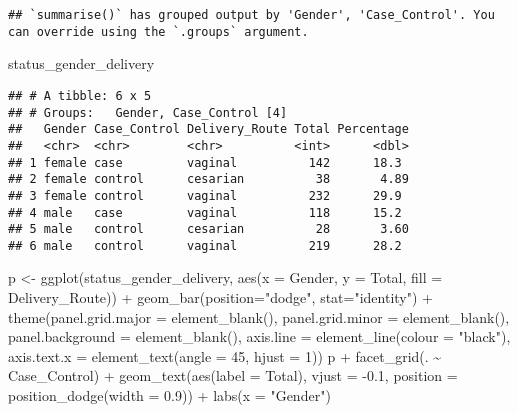 \documentclass[
]{article}
\newenvironment{Shaded}{\begin{snugshade}}{\end{snugshade}}
\newcommand{\AttributeTok}[1]{\textcolor[rgb]{0.77,0.63,0.00}{#1}}
\newcommand{\DecValTok}[1]{\textcolor[rgb]{0.00,0.00,0.81}{#1}}
\newcommand{\FloatTok}[1]{\textcolor[rgb]{0.00,0.00,0.81}{#1}}
\newcommand{\FunctionTok}[1]{\textcolor[rgb]{0.00,0.00,0.00}{#1}}
\newcommand{\NormalTok}[1]{#1}
\newcommand{\OtherTok}[1]{\textcolor[rgb]{0.56,0.35,0.01}{#1}}
\newcommand{\SpecialCharTok}[1]{\textcolor[rgb]{0.00,0.00,0.00}{#1}}
\newcommand{\StringTok}[1]{\textcolor[rgb]{0.31,0.60,0.02}{#1}}
\begin{document}
\begin{verbatim}
## `summarise()` has grouped output by 'Gender', 'Case_Control'. You can override using the `.groups` argument.
\end{verbatim}

\begin{Shaded}
\begin{Highlighting}[]
\NormalTok{status\_gender\_delivery}
\end{Highlighting}
\end{Shaded}

\begin{verbatim}
## # A tibble: 6 x 5
## # Groups:   Gender, Case_Control [4]
##   Gender Case_Control Delivery_Route Total Percentage
##   <chr>  <chr>        <chr>          <int>      <dbl>
## 1 female case         vaginal          142      18.3 
## 2 female control      cesarian          38       4.89
## 3 female control      vaginal          232      29.9 
## 4 male   case         vaginal          118      15.2 
## 5 male   control      cesarian          28       3.60
## 6 male   control      vaginal          219      28.2
\end{verbatim}

\begin{Shaded}
\begin{Highlighting}[]
\NormalTok{p }\OtherTok{\textless{}{-}} \FunctionTok{ggplot}\NormalTok{(status\_gender\_delivery, }\FunctionTok{aes}\NormalTok{(}\AttributeTok{x =}\NormalTok{ Gender, }\AttributeTok{y =}\NormalTok{ Total, }\AttributeTok{fill =}\NormalTok{ Delivery\_Route)) }\SpecialCharTok{+}
  \FunctionTok{geom\_bar}\NormalTok{(}\AttributeTok{position=}\StringTok{"dodge"}\NormalTok{, }\AttributeTok{stat=}\StringTok{"identity"}\NormalTok{) }\SpecialCharTok{+} 
  \FunctionTok{theme}\NormalTok{(}\AttributeTok{panel.grid.major =} \FunctionTok{element\_blank}\NormalTok{(),}
        \AttributeTok{panel.grid.minor =} \FunctionTok{element\_blank}\NormalTok{(), }\AttributeTok{panel.background =} \FunctionTok{element\_blank}\NormalTok{(), }\AttributeTok{axis.line =}
          \FunctionTok{element\_line}\NormalTok{(}\AttributeTok{colour =} \StringTok{"black"}\NormalTok{), }\AttributeTok{axis.text.x =} \FunctionTok{element\_text}\NormalTok{(}\AttributeTok{angle =} \DecValTok{45}\NormalTok{, }\AttributeTok{hjust =} \DecValTok{1}\NormalTok{))}
\NormalTok{p }\SpecialCharTok{+} \FunctionTok{facet\_grid}\NormalTok{(. }\SpecialCharTok{\textasciitilde{}}\NormalTok{ Case\_Control) }\SpecialCharTok{+} \FunctionTok{geom\_text}\NormalTok{(}\FunctionTok{aes}\NormalTok{(}\AttributeTok{label =}\NormalTok{ Total), }\AttributeTok{vjust =} \SpecialCharTok{{-}}\FloatTok{0.1}\NormalTok{, }\AttributeTok{position =}
      \FunctionTok{position\_dodge}\NormalTok{(}\AttributeTok{width =} \FloatTok{0.9}\NormalTok{)) }\SpecialCharTok{+}
        \FunctionTok{labs}\NormalTok{(}\AttributeTok{x =} \StringTok{"Gender"}\NormalTok{)}
\end{Highlighting}
\end{Shaded}
\end{document}
